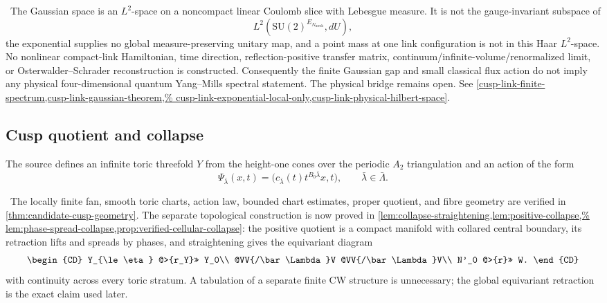 \begin{auditrecord}
\Open\ The Gaussian space is an \(L^2\)-space on a noncompact linear
Coulomb slice with Lebesgue measure.  It is not the gauge-invariant subspace
of
\[
 L^2(\mathrm{SU}(2)^{E_{N_{\mathrm{mesh}}}},dU),
\]
the exponential supplies no global measure-preserving unitary map, and a
point mass at one link configuration is not in this Haar \(L^2\)-space.
No nonlinear compact-link Hamiltonian, time direction, reflection-positive
transfer matrix, continuum/infinite-volume/renormalized limit, or
Osterwalder--Schrader reconstruction is constructed.  Consequently the
finite Gaussian gap and small classical flux action do not imply any
physical four-dimensional quantum Yang--Mills spectral statement.  The
physical bridge remains open.  See
\cref{cusp-link-finite-spectrum,cusp-link-gaussian-theorem,%
cusp-link-exponential-local-only,cusp-link-physical-hilbert-space}.
\end{auditrecord}

\subsection{Cusp quotient and collapse}

The source defines an infinite toric threefold $Y$ from the height-one cones over the periodic $A_2$ triangulation and an action of the form
\[
\Psi_{\bar\lambda}(x,t)
=\bigl(c_{\bar\lambda}(t)t^{B_0\bar\lambda}x,t\bigr),
\qquad \bar\lambda\in\bar\Lambda.
\]

\begin{auditrecord}
\Verified\ The locally finite fan, smooth toric charts, action law, bounded
chart estimates, proper quotient, and fibre geometry are verified in
\cref{thm:candidate-cusp-geometry}.  The separate topological construction is
now proved in
\cref{lem:collapse-straightening,lem:positive-collapse,%
lem:phase-spread-collapse,prop:verified-cellular-collapse}: the positive
quotient is a compact manifold with collared central boundary, its retraction
lifts and spreads by phases, and straightening gives the equivariant diagram
\[
\begin{CD}
Y_{\le\eta} @>{r_Y}>> Y_0\\
@VV{/\bar\Lambda}V @VV{/\bar\Lambda}V\\
N'_0 @>{r}>> W.
\end{CD}
\]
with continuity across every toric stratum.  A tabulation of a separate finite
CW structure is unnecessary; the global equivariant retraction is the exact
claim used later.
\end{auditrecord}

